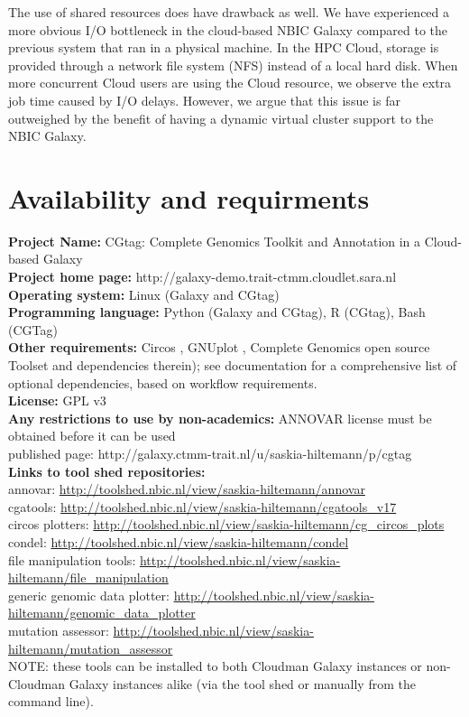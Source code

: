 The use of shared resources does have drawback as well. We have experienced a more obvious I/O bottleneck in the cloud-based NBIC Galaxy compared to the previous system that ran in a physical machine. In the HPC Cloud, storage is provided through a network file system (NFS) instead of a local hard disk. When more concurrent Cloud users are using the Cloud resource, we observe the extra job time caused by I/O delays. However, we argue that this issue is far outweighed by the benefit of having a dynamic virtual cluster support to the NBIC Galaxy.


\section*{Availability and requirments}

\textbf{Project Name:} CGtag: Complete Genomics Toolkit and Annotation in a Cloud-based Galaxy\\
\textbf{Project home page:} http://galaxy-demo.trait-ctmm.cloudlet.sara.nl\\
\textbf{Operating system:} Linux (Galaxy and CGtag)\\
\textbf{Programming language:} Python (Galaxy and CGtag), R (CGtag), Bash (CGTag) \\
\textbf{Other requirements:} Circos \cite{url-circos}, GNUplot \cite{url-gnuplot}, Complete Genomics open source Toolset \cite{url-cgatools}  and dependencies therein);  see documentation for a comprehensive list of optional dependencies, based on workflow requirements.\\
\textbf{License:} GPL v3\\
\textbf{Any restrictions to use by non-academics:} ANNOVAR license must be obtained before it can be used\\
published page: http://galaxy.ctmm-trait.nl/u/saskia-hiltemann/p/cgtag \\
\textbf{Links to tool shed repositories:}\\
annovar: \url{http://toolshed.nbic.nl/view/saskia-hiltemann/annovar} \\
cgatools: \url{http://toolshed.nbic.nl/view/saskia-hiltemann/cgatools\_v17} \\
circos plotters: \url{http://toolshed.nbic.nl/view/saskia-hiltemann/cg\_circos\_plots} \\
condel: \url{http://toolshed.nbic.nl/view/saskia-hiltemann/condel} \\
file manipulation tools: \url{http://toolshed.nbic.nl/view/saskia-hiltemann/file\_manipulation} \\
generic genomic data plotter: \url{http://toolshed.nbic.nl/view/saskia-hiltemann/genomic\_data\_plotter} \\
mutation assessor: \url{http://toolshed.nbic.nl/view/saskia-hiltemann/mutation\_assessor}\\
NOTE: these tools can be installed to both Cloudman Galaxy instances or non-Cloudman Galaxy instances alike (via the tool shed or manually from the command line).

